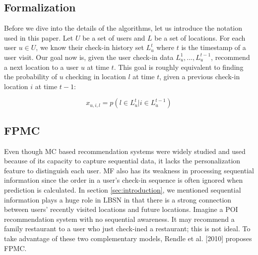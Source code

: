 \documentclass{sig-alternate}
\begin{document}
\subsection{Formalization}
\label{sec:typeChangesSpecialChars}

Before we dive into the details of the algorithms, let us introduce the notation used in this paper. 
Let $U$ be a set of users and $L$ be a set of locations. For each user $u \in U$, 
we know their check-in history set \begin{math}L^t_u\end{math} where $t$ is the timestamp 
of a user visit. Our goal now is, given the user check-in data 
\begin{math}L^1_u,...,L^{t-1}_u\end{math}, recommend a next location to 
a user $u$ at time $t$. This goal is roughly equivalent to finding the probability of $u$ 
checking in location $l$ at time $t$, given a previous check-in location $i$ at time $t-1$:

\begin{equation}
	x_{u,i,l}=p(l \in L_u^t | i \in L_u^{t-1})
\label{eq:goal}
\end{equation}

\subsection{FPMC}
\label{sec:typeChangesSpecialChars}

Even though MC based recommendation systems were widely studied and used because of 
its capacity to capture sequential data, it lacks the personalization feature to distinguish each user. 
MF also has its weakness in processing sequential information since the order in a user's check-in sequence 
is often ignored when prediction is calculated.
In section \ref{sec:introduction}, we mentioned sequential information plays a huge role in LBSN 
in that there is a strong connection between users' recently visited locations and future locations. 
Imagine a POI recommendation system with no sequential awareness. 
It may recommend a family restaurant to a user who just check-ined a restaurant; this is not ideal. 
To take advantage of these two complementary models, Rendle et al. [2010] proposes FPMC.
\end{document}
